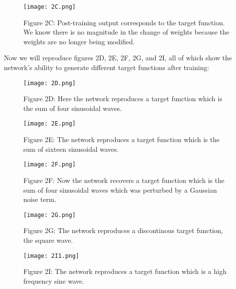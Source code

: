 \documentclass{article}
\begin{document}
\begin{figure}[ht]
    \centering
    \texttt{[image: 2C.png]}
    \captionsetup{font=normalsize, width=1\textwidth, labelformat=empty}
    \caption{Figure 2C: Post-training output corresponds to the target function. We know there is no magnitude in the change of weights because the weights are no longer being modified.}
\end{figure}
\vspace{5em}

\FloatBarrier
Now we will reproduce figures 2D, 2E, 2F, 2G, and 2I, all of which show the network's ability to generate different target functions after training:

\begin{figure}[ht]
    \centering
    \texttt{[image: 2D.png]}
    \captionsetup{font=normalsize, width=1\textwidth, labelformat=empty}
    \caption{Figure 2D: Here the network reproduces a target function which is the sum of four sinusoidal waves.}
    \vspace{2em}

    \centering
    \texttt{[image: 2E.png]}
    \captionsetup{font=normalsize, width=1\textwidth, labelformat=empty}
    \caption{Figure 2E: The network reproduces a target function which is the sum of sixteen sinusoidal waves.}
\end{figure}

\begin{figure}[ht]
    \centering
    \texttt{[image: 2F.png]}
    \captionsetup{font=normalsize, width=1\textwidth, labelformat=empty}
    \caption{Figure 2F: Now the network recovers a target function which is the sum of four sinusoidal waves which was perturbed by a Gaussian noise term.}
    \vspace{2em}

    \texttt{[image: 2G.png]}
    \captionsetup{font=normalsize, width=1\textwidth, labelformat=empty}
    \caption{Figure 2G: The network reproduces a discontinous target function, the square wave.}
    \vspace{2em}

    \texttt{[image: 2I1.png]}
    \captionsetup{font=normalsize, width=1\textwidth, labelformat=empty}
    \caption{Figure 2I: The network reproduces a target function which is a high frequency sine wave.}
\end{figure}
\vspace{5em}
\end{document}
